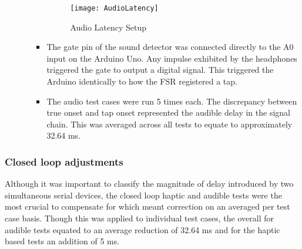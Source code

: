 \begin{itemize}
\begin{itemize}
\begin{itemize}
            \begin{figure}[H]
                \centering
                \texttt{[image: AudioLatency]}
                \caption{Audio Latency Setup}
            \end{figure}
            \item The gate pin of the sound detector was connected directly to the A0 input on the Arduino Uno. Any impulse exhibited by the headphones triggered the gate to output a digital signal. This triggered the Arduino identically to how the FSR registered a tap. 
            \item The audio test cases were run 5 times each. The discrepancy between true onset and tap onset represented the audible delay in the signal chain. This was averaged across all tests to equate to approximately 32.64 ms.
        \end{itemize}
    \end{itemize}
\end{itemize}
\subsubsection{Closed loop adjustments}
Although it was important to classify the magnitude of delay introduced by two simultaneous serial devices, the closed loop haptic and audible tests were the most crucial to compensate for which meant correction on an averaged per test case basis. Though this was applied to individual test cases, the overall for audible tests equated to an average reduction of 32.64 ms and for the haptic based tests an addition of 5 ms.